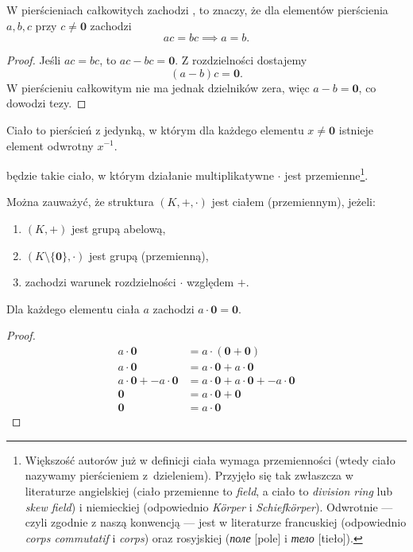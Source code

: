 \begin{lemma}
    \label{l:cancellation_property}
    W pierścieniach całkowitych zachodzi , to znaczy, że dla elementów pierścienia $a, b, c$ przy $c \neq \symbf{0}$ zachodzi
    \[ ac = bc \implies a = b. \]
\end{lemma}
\begin{proof}
    Jeśli $ac = bc$, to $ac - bc = \symbf{0}$. Z rozdzielności dostajemy
    \[ (a - b)c = \symbf{0}. \]
    W pierścieniu całkowitym nie ma jednak dzielników zera, więc $a - b = \symbf{0}$, co dowodzi tezy.
\end{proof}

\begin{definition}
    Ciało to pierścień z jedynką, w którym dla każdego elementu $x \neq \symbf{0}$ istnieje element odwrotny $x^{-1}$.
\end{definition}

 będzie takie ciało, w którym działanie multiplikatywne $\cdot$ jest przemienne\footnote{Większość autorów już w definicji ciała wymaga przemienności (wtedy ciało nazywamy pierścieniem z~dzieleniem). Przyjęło się tak zwłaszcza w literaturze angielskiej (ciało przemienne to \textit{field}, a ciało to \textit{division ring} lub \textit{skew field}) i niemieckiej (odpowiednio \textit{Körper} i \textit{Schiefkörper}).
Odwrotnie --- czyli zgodnie z naszą konwencją --- jest w literaturze francuskiej (odpowiednio \textit{corps commutatif} i \textit{corps}) oraz rosyjskiej (\textit{\foreignlanguage{russian}{поле}} [pole] i \textit{\foreignlanguage{russian}{тело}} [tieło]).}.

Można zauważyć, że struktura $(K, +, \cdot)$ jest ciałem (przemiennym), jeżeli:
\begin{enumerate}
    \item $(K, +)$ jest grupą abelową,
    \item $(K \setminus \{\symbf{0}\}, \cdot)$ jest grupą (przemienną),
    \item zachodzi warunek rozdzielności $\cdot$ względem $+$.
\end{enumerate}

\begin{lemma}
    \label{l:a0=0}
    Dla każdego elementu ciała $a$ zachodzi $a \cdot \symbf{0} = \symbf{0}$.
\end{lemma}
\begin{proof}
    \begin{align*}             a \cdot \symbf{0} &= a \cdot (\symbf{0} + \symbf{0}) \\
                               a \cdot \symbf{0} &= a \cdot \symbf{0} + a \cdot \symbf{0} \\
        a \cdot \symbf{0} + - a \cdot \symbf{0} &= a \cdot \symbf{0} + a \cdot \symbf{0} + - a \cdot \symbf{0} \\
                                       \symbf{0} &= a \cdot \symbf{0} + \symbf{0} \\
                                       \symbf{0} &= a \cdot \symbf{0}
    \end{align*}
\end{proof}

